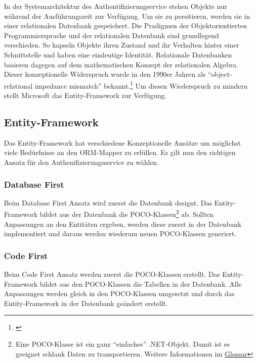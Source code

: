 In der Systemarchitektur des Authentifizierungservice stehen Objekte nur
während der Ausführungszeit zur Verfügung. Um sie zu persitieren, werden
sie in einer relationalen Datenbank gespeichert. Die Pradigmen der
Objektorientierten Programmiersprache und der relationalen Datenbank
sind grundlegend verschieden. So kapseln Objekte ihren Zustand und ihr
Verhalten hinter einer Schnittstelle und haben eine eindeutige
Identität. Relationale Datenbanken basieren dagegen auf dem
mathematischen Konzept der relationalen Algebra. Dieser konzeptionelle
Widerspruch wurde in den 1990er Jahren als ``object-relational impedance
mismatch'' bekannt.\footnote{\autocite{the-vietnam-of-computer-science}}
Um diesen Wiederspruch zu mindern stellt Microsoft das Entity-Framework
zur Verfügung.

\subsection{Entity-Framework}\label{entity-framework}

Das Entity-Framework hat verschiedene Konzeptionelle Ansätze um
möglichst viele Bedürfnisse an den ORM-Mapper zu erfüllen. Es gilt nun
den richtigen Ansatz für den Authenifizierungsservice zu wählen.

\subsubsection{Database First}\label{database-first}

Beim Database First Ansatz wird zuerst die Datenbank designt. Das
Entity-Framework bildet aus der Datenbank die POCO-Klassen\footnote{Eine
  POCO-Klasse ist ein ganz ``einfaches'' .NET-Objekt. Damit ist es
  geeignet schlank Daten zu transportieren. Weitere Informationen im
  \protect\hyperlink{glossar}{Glossar}} ab. Sollten Anpassungen an den
Entitäten ergeben, werden diese zuerst in der Datenbank implementiert
und daraus werden wiederum neuen POCO-Klassen generiert.

\subsubsection{Code First}\label{code-first}

Beim Code First Ansatz werden zuerst die POCO-Klassen erstellt. Das
Entity-Framework bildet aus den POCO-Klassen die Tabellen in der
Datenbank. Alle Anpassungen werden gleich in den POCO-Klassen umgesetzt
und durch das Entity-Framework in der Datenbank geändert erstellt.

